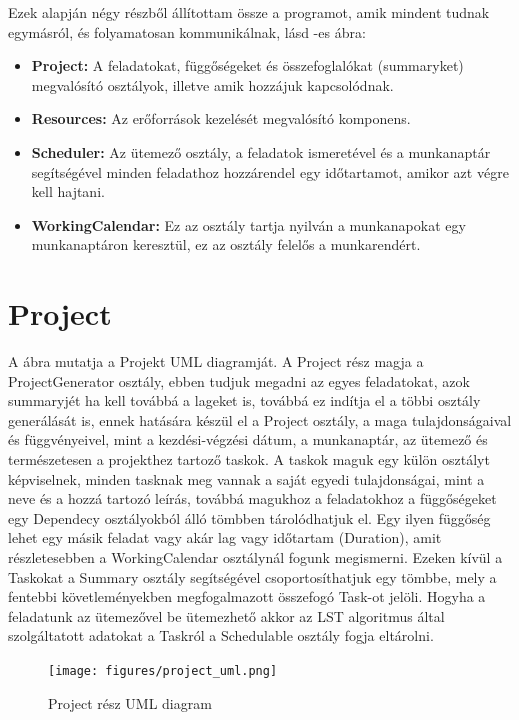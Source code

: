Ezek alapján négy részből állítottam össze a programot, amik mindent tudnak egymásról, és folyamatosan kommunikálnak, lásd -es ábra:
\begin{itemize}
	\item \textbf{Project:} A feladatokat, függőségeket és összefoglalókat (summaryket) megvalósító osztályok, illetve amik hozzájuk kapcsolódnak.
	\item \textbf{Resources:} Az erőforrások kezelését megvalósító komponens.
	\item \textbf{Scheduler:} Az ütemező osztály, a feladatok ismeretével és a munkanaptár segítségével minden feladathoz hozzárendel egy időtartamot, amikor azt végre kell hajtani.
	\item \textbf{WorkingCalendar:}  Ez az osztály tartja nyilván a munkanapokat egy munkanaptáron keresztül, ez az osztály felelős a munkarendért.
\end{itemize}

\section{Project}
\hspace{2mm} A  ábra mutatja a Projekt UML diagramját. A Project rész magja a ProjectGenerator osztály, ebben tudjuk megadni az egyes feladatokat, azok summaryjét ha kell továbbá a lageket is, továbbá ez indítja el a többi osztály generálását is, ennek hatására készül el a Project osztály, a maga tulajdonságaival és függvényeivel, mint a kezdési-végzési dátum, a munkanaptár, az ütemező és természetesen a projekthez tartoző taskok. A taskok maguk egy külön osztályt képviselnek, minden tasknak meg vannak a saját egyedi tulajdonságai, mint a neve és a hozzá tartozó leírás, továbbá magukhoz a feladatokhoz a függőségeket egy Dependecy osztályokból álló tömbben tárolódhatjuk el. Egy ilyen függőség lehet egy másik feladat vagy akár lag vagy időtartam (Duration), amit részletesebben a WorkingCalendar osztálynál fogunk megismerni. Ezeken kívül a Taskokat a Summary osztály segítségével csoportosíthatjuk egy tömbbe, mely a fentebbi követleményekben megfogalmazott összefogó Task-ot jelöli. Hogyha a feladatunk az ütemezővel be ütemezhető akkor az LST algoritmus által szolgáltatott adatokat a Taskról a Schedulable osztály fogja eltárolni.
\begin{figure}[!ht]
\centering
\texttt{[image: figures/project\_uml.png]}
\caption{Project rész UML diagram} 
\label{fig:project_uml}
\end{figure} 

